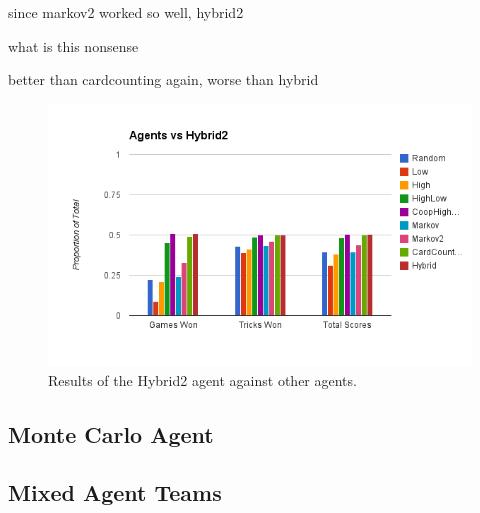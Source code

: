 since markov2 worked so well, hybrid2


what is this nonsense


better than cardcounting again, worse than hybrid

\begin{figure}[h]
    \centering
    \includegraphics[scale=0.5]{data/hybrid2.png}
    \caption{Results of the Hybrid2 agent against other agents.}
    \label{fig:results_hybrid2}
\end{figure}



\subsection{Monte Carlo Agent}



\subsection{Mixed Agent Teams}

